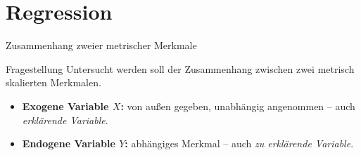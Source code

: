 \documentclass[aspectratio=169,11pt]{beamer}
\begin{document}

\section{Regression}


\begin{frame}{Zusammenhang zweier metrischer Merkmale}
  \begin{block}{Fragestellung}
    Untersucht werden soll der Zusammenhang zwischen zwei metrisch
    skalierten Merkmalen.
  \end{block}

  \medskip

  \begin{itemize}
    \item \textbf{Exogene Variable $X$:} von außen gegeben, unabhängig
          angenommen -- auch \emph{erklärende Variable}.
    \item \textbf{Endogene Variable $Y$:} abhängiges Merkmal -- auch
          \emph{zu erklärende Variable}.
  \end{itemize}
\end{frame}


\end{document}
